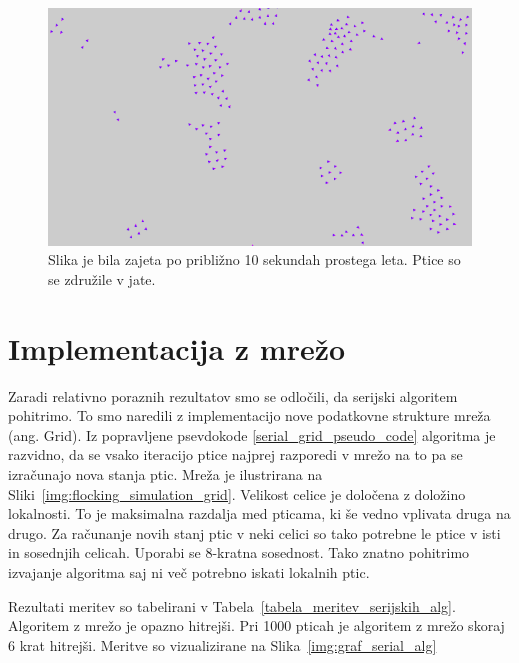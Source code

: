 \documentclass[a4paper, 12pt]{book}
\begin{document}
\begin{figure}[t]
\includegraphics[width=\textwidth]{flocking_simulation_demo}
\caption{Slika je bila zajeta po približno 10 sekundah prostega leta. Ptice so se združile v jate.}
\label{img:flocking_simulation_demo}
\centering
\end{figure}

\section{Implementacija z mrežo}
Zaradi relativno poraznih rezultatov smo se odločili, da serijski algoritem pohitrimo. To smo naredili z implementacijo nove podatkovne strukture mreža (ang. Grid). Iz popravljene psevdokode \ref{serial_grid_pseudo_code} algoritma je razvidno, da se vsako iteracijo ptice najprej razporedi v mrežo na to pa se izračunajo nova stanja ptic. Mreža je ilustrirana na Sliki~\ref{img:flocking_simulation_grid}. Velikost celice je določena z doložino lokalnosti. To je maksimalna razdalja med pticama, ki še vedno vplivata druga na drugo. Za računanje novih stanj ptic v neki celici so tako potrebne le ptice v isti in sosednjih celicah. Uporabi se 8-kratna sosednost. Tako znatno pohitrimo izvajanje algoritma saj ni več potrebno iskati lokalnih ptic.

Rezultati meritev so tabelirani v Tabela~\ref{tabela_meritev_serijskih_alg}. Algoritem z mrežo je opazno hitrejši. Pri 1000 pticah je algoritem z mrežo skoraj 6 krat hitrejši. Meritve so vizualizirane na Slika~\ref{img:graf_serial_alg}
\end{document}
